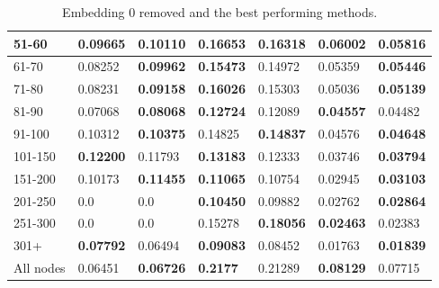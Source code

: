 \begin{table}[h!]
\begin{tabular}{|l|l|l||l|l||l|l|}
        51-60     & 0.09665                                 & \textbf{0.10110}               & \textbf{0.16653}                 & 0.16318           & 0.06002          & \textbf{0.05816}  \\ \hline
        61-70     & 0.08252                                 & \textbf{0.09962}               & \textbf{0.15473}                 & 0.14972           & 0.05359          & \textbf{0.05446}  \\ \hline
        71-80     & 0.08231                                 & \textbf{0.09158}               & \textbf{0.16026}                 & 0.15303           & 0.05036          & \textbf{0.05139}  \\ \hline
        81-90     & 0.07068                                 & \textbf{0.08068}               & \textbf{0.12724}                 & 0.12089           & \textbf{0.04557} & 0.04482           \\ \hline
        91-100    & 0.10312                                 & \textbf{0.10375}               & 0.14825                          & \textbf{0.14837}  & 0.04576          & \textbf{0.04648}  \\ \hline
        101-150   & \textbf{0.12200}                        & 0.11793                        & \textbf{0.13183}                 & 0.12333           & 0.03746          & \textbf{0.03794}  \\ \hline
        151-200   & 0.10173                                 & \textbf{0.11455}               & \textbf{0.11065}                 & 0.10754           & 0.02945          & \textbf{0.03103}  \\ \hline
        201-250   & 0.0                                     & 0.0                            & \textbf{0.10450}                 & 0.09882           & 0.02762          & \textbf{0.02864}  \\ \hline
        251-300   & 0.0                                     & 0.0                            & 0.15278                          & \textbf{0.18056}  & \textbf{0.02463} & 0.02383           \\ \hline
        301+      & \textbf{0.07792}                        & 0.06494                        & \textbf{0.09083}                 & 0.08452           & 0.01763          & \textbf{0.01839}  \\ \hline
        All nodes & 0.06451                                 & \textbf{0.06726}               & \textbf{0.2177 }                 & 0.21289           & \textbf{0.08129} & 0.07715           \\ \hline
    \end{tabular}
    \caption{Embedding 0 removed and the best performing methods.}
    \label{tab:recall-adjusted-layer-remove-0-embedding}
\end{table}

